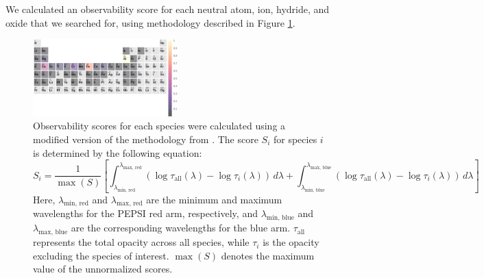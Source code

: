 \documentclass[twocolumn]{aastex631}
\begin{document}
            We calculated an observability score for each neutral atom, ion, hydride, and oxide that we searched for, using methodology described in Figure \ref{fig:observability_scores}.
            
            \begin{figure} \label{fig:observability_scores}
                \centering
                \includegraphics[width=0.5\textwidth]{plots/observability_table.png}
                \caption{Observability scores for each species were calculated using a modified version of the methodology from \citet{Kesseli2022, Petz2023}. The score \(S_i\) for species \(i\) is determined by the following equation:
                \begin{equation}
                S_i = \frac{1}{\max(S)} \left[ \int_{\lambda_\text{min, red}}^{\lambda_\text{max, red}} \left( \log \tau_\text{all}(\lambda) - \log \tau_i(\lambda) \right) \, d\lambda + \int_{\lambda_\text{min, blue}}^{\lambda_\text{max, blue}} \left( \log \tau_\text{all}(\lambda) - \log \tau_i(\lambda) \right) \, d\lambda \right]
                \end{equation}
                Here, \(\lambda_\text{min, red}\) and \(\lambda_\text{max, red}\) are the minimum and maximum wavelengths for the PEPSI red arm, respectively, and \(\lambda_\text{min, blue}\) and \(\lambda_\text{max, blue}\) are the corresponding wavelengths for the blue arm. \(\tau_\text{all}\) represents the total opacity across all species, while \(\tau_i\) is the opacity excluding the species of interest. \(\max(S)\) denotes the maximum value of the unnormalized scores.}
            \end{figure}

            
            
\end{document}
